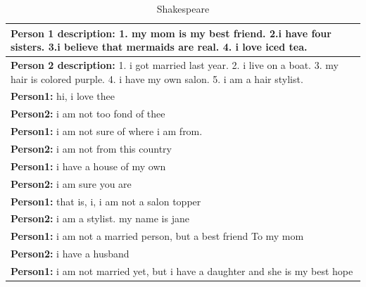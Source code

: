 \begin{table}[ht]
\centering
 \begin{tabular}{|p{14cm}|} 
 \hline\hline
 \textbf{Person 1 description:} 1. my mom is my best friend. 2.i have four sisters. 3.i believe that mermaids are real. 4. i love iced tea. \\
 \hline
 \textbf{Person 2 description:} 1. i got married last year. 2. i live on a boat. 3. my hair is colored purple. 4. i have my own salon. 5. i am a hair stylist. \\
 \hline\hline
 \textbf{Person1:} hi, i love thee \\
 \textbf{Person2:} i am not too fond of thee \\
 \textbf{Person1:} i am not sure of where i am from. \\ 
 \textbf{Person2:} i am not from this country \\
 \textbf{Person1:} i have a house of my own\\
 \textbf{Person2:} i am sure you are \\
 \textbf{Person1:} that is, i, i am not a salon topper \\
 \textbf{Person2:} i am a stylist. my name is jane\\
 \textbf{Person1:} i am not a married person, but a best friend To my mom \\
 \textbf{Person2:} i have a husband \\
 \textbf{Person1:} i am not married yet, but i have a daughter and she is my best hope \\
 \hline\hline
 \end{tabular}
 \caption{Shakespeare}
\label{tab:shake1}
\end{table}



